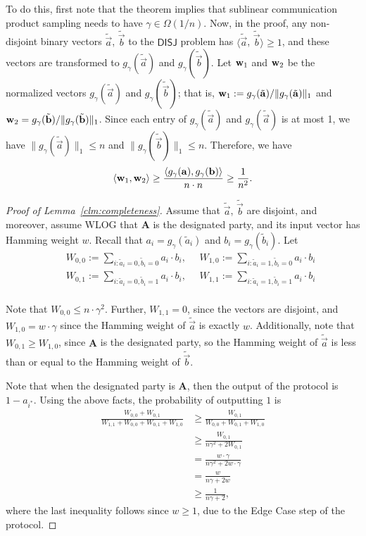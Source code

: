 To do this, first note that the theorem implies that sublinear
communication product sampling needs to have $\gamma \in \Omega(1/n)$. 
%
Now, in the proof, any non-disjoint binary vectors $\tilde{\vec{a}}$,
$\tilde{\vec{b}}$ to the $\mathsf{DISJ}$ problem has $\langle
\tilde{\vec{a}}$, $\tilde{\vec{b}} \rangle \ge 1$, and these vectors are
transformed to $g_\gamma(\tilde{\vec{a}})$ and
$g_\gamma(\tilde{\vec{b}})$.
%
Let $\mathbf{w}_1$ and $\mathbf{w}_2$ be the normalized vectors
$g_\gamma(\tilde{\vec{a}})$ and $g_\gamma(\tilde{\vec{b}})$; that is,
$\mathbf{w}_1 := g_\gamma(\tilde{\mathbf{a}}) / \| g_\gamma(\tilde{\mathbf{a}}) \|_1$
and $\mathbf{w}_2 =  g_\gamma(\tilde{\mathbf{b}}) / \| g_\gamma(\tilde{\mathbf{b}})
\|_1$. Since each entry of $g_\gamma(\tilde{\vec{a}})$ and
$g_\gamma(\tilde{\vec{a}})$ is at most 1, we have $\|g_\gamma(\tilde{\vec{a}})\|_1 \le n$ and $\|g_\gamma(\tilde{\vec{b}})\|_1 \le n$.
Therefore, we have 
%
$$\langle \mathbf{w}_1, \mathbf{w}_2 \rangle \ge \frac {\langle g_\gamma(\mathbf{a}), g_\gamma(\mathbf{b}) \rangle } { n \cdot n } \ge \frac 1 {n^2}.$$ 

\begin{proof}[Proof of Lemma~\ref{clm:completeness}]
Assume that $\tilde{\vec{a}}$, $\tilde{\vec{b}}$ are disjoint, and
moreover, assume WLOG that $\mathbf{A}$ is the designated party, and its
input vector has Hamming weight $w$.  Recall that $a_i = g_\gamma(\tilde
a_i)$ and $b_i = g_\gamma(\tilde b_i)$. 
Let 
\begin{eqnarray*} 
&& W_{0,0} :=  \sum_{i : \tilde{a}_i=0, \tilde{b}_i=0} a_i \cdot b_i,
~~~~~~ 
W_{1,0}  :=  \sum_{i : \tilde{a}_i=1, \tilde{b}_i=0} a_i \cdot b_i \\
&& W_{0,1}  :=  \sum_{i : \tilde{a}_i=0, \tilde{b}_i=1} a_i \cdot b_i,
~~~~~~
W_{1,1}  :=  \sum_{i : \tilde{a}_i=1, \tilde{b}_i=1} a_i \cdot b_i \\
\end{eqnarray*}

Note that $W_{0,0} \leq n \cdot \gamma^2$.  Further, $W_{1,1} = 0$,
since the vectors are disjoint, and $W_{1,0} = w \cdot \gamma$ since the
Hamming weight of $\tilde{\vec{a}}$ is exactly $w$.  Additionally, note
that $W_{0,1} \geq W_{1,0}$, since $\mathbf{A}$ is the designated party,
so the Hamming weight of $\tilde{\vec{a}}$ is less than or equal to the
Hamming weight of $\tilde{\vec{b}}$.

Note that when the designated party is $\mathbf{A}$, then the output of
the protocol is $1 - a_{i^*}$. Using the above facts, the probability
of outputting $1$ is 
%
\begin{align*}
\frac{W_{0,0} + W_{0,1}}{W_{1,1} + W_{0,0} + W_{0,1} + W_{1,0}}
&\ge 
\frac{W_{0,1}}{W_{0,0} + W_{0,1} + W_{1,0}}\\
&\geq \frac{W_{0,1}}{n\gamma^2 + 2W_{0,1}}\\
&=\frac{w \cdot \gamma}{n\gamma^2 + 2w \cdot \gamma}\\
&=\frac{w}{n\gamma + 2w}\\
&\geq \frac{1}{n\gamma + 2},
\end{align*}
where the last inequality follows since $w \geq 1$, due to the Edge Case
step of the protocol. 
\end{proof}


